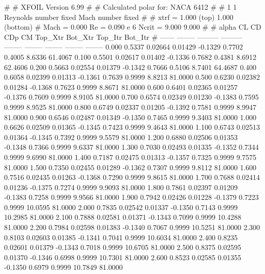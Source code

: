 #  
#       XFOIL         Version 6.99
#  
# Calculated polar for: NACA 6412                                       
#  
# 1 1 Reynolds number fixed          Mach number fixed         
#  
# xtrf =   1.000 (top)        1.000 (bottom)  
# Mach =   0.000     Re =     0.090 e 6     Ncrit =   9.000  9.000
#  
#   alpha    CL        CD       CDp       CM     Top_Xtr  Bot_Xtr  Top_Itr  Bot_Itr
#  ------ -------- --------- --------- -------- -------- -------- -------- --------
   0.000   0.5337   0.02664   0.01429  -0.1329   0.7702   0.4005   8.6336  61.4067
   0.100   0.5501   0.02617   0.01402  -0.1336   0.7682   0.4381   8.6912  62.4606
   0.200   0.5663   0.02554   0.01379  -0.1342   0.7666   0.5106   8.7401  64.4687
   0.400   0.6058   0.02399   0.01313  -0.1361   0.7639   0.9999   8.8213  81.0000
   0.500   0.6230   0.02382   0.01284  -0.1368   0.7623   0.9999   8.8671  81.0000
   0.600   0.6401   0.02365   0.01257  -0.1376   0.7609   0.9999   8.9105  81.0000
   0.700   0.6574   0.02349   0.01230  -0.1383   0.7595   0.9999   8.9525  81.0000
   0.800   0.6749   0.02337   0.01205  -0.1392   0.7581   0.9999   8.9947  81.0000
   0.900   0.6546   0.02487   0.01349  -0.1350   0.7465   0.9999   9.3403  81.0000
   1.000   0.6626   0.02509   0.01365  -0.1345   0.7423   0.9999   9.4643  81.0000
   1.100   0.6743   0.02513   0.01364  -0.1345   0.7392   0.9999   9.5579  81.0000
   1.200   0.6880   0.02506   0.01353  -0.1348   0.7366   0.9999   9.6337  81.0000
   1.300   0.7030   0.02493   0.01335  -0.1352   0.7344   0.9999   9.6990  81.0000
   1.400   0.7187   0.02475   0.01313  -0.1357   0.7325   0.9999   9.7575  81.0000
   1.500   0.7350   0.02455   0.01289  -0.1362   0.7307   0.9999   9.8112  81.0000
   1.600   0.7516   0.02435   0.01263  -0.1368   0.7290   0.9999   9.8615  81.0000
   1.700   0.7688   0.02414   0.01236  -0.1375   0.7274   0.9999   9.9093  81.0000
   1.800   0.7861   0.02397   0.01209  -0.1383   0.7258   0.9999   9.9566  81.0000
   1.900   0.7942   0.02426   0.01228  -0.1379   0.7223   0.9999  10.0595  81.0000
   2.000   0.7835   0.02542   0.01337  -0.1350   0.7143   0.9999  10.2985  81.0000
   2.100   0.7888   0.02581   0.01371  -0.1343   0.7099   0.9999  10.4288  81.0000
   2.200   0.7984   0.02598   0.01383  -0.1340   0.7067   0.9999  10.5251  81.0000
   2.300   0.8103   0.02603   0.01385  -0.1341   0.7041   0.9999  10.6034  81.0000
   2.400   0.8235   0.02601   0.01379  -0.1343   0.7018   0.9999  10.6705  81.0000
   2.500   0.8375   0.02595   0.01370  -0.1346   0.6998   0.9999  10.7301  81.0000
   2.600   0.8523   0.02585   0.01355  -0.1350   0.6979   0.9999  10.7849  81.0000

